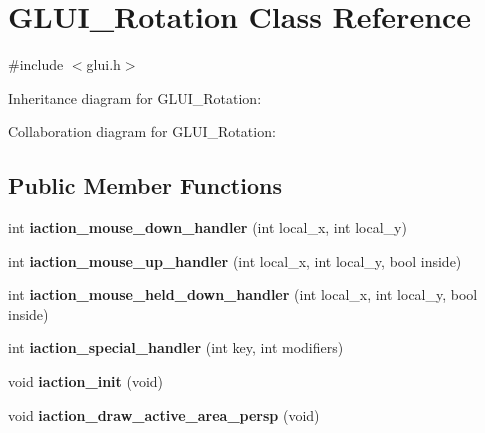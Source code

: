 \hypertarget{class_g_l_u_i___rotation}{\section{G\+L\+U\+I\+\_\+\+Rotation Class Reference}
\label{class_g_l_u_i___rotation}
}


{\ttfamily \#include $<$glui.\+h$>$}



Inheritance diagram for G\+L\+U\+I\+\_\+\+Rotation\+:


Collaboration diagram for G\+L\+U\+I\+\_\+\+Rotation\+:
\subsection*{Public Member Functions}
\begin{DoxyCompactItemize}
\item 
\hypertarget{class_g_l_u_i___rotation_a3af15515b4f2bd05bfbbc625fa4d6247}{int {\bfseries iaction\+\_\+mouse\+\_\+down\+\_\+handler} (int local\+\_\+x, int local\+\_\+y)}\label{class_g_l_u_i___rotation_a3af15515b4f2bd05bfbbc625fa4d6247}

\item 
\hypertarget{class_g_l_u_i___rotation_aa3ee9f07c589dedc7c1b6ad780566172}{int {\bfseries iaction\+\_\+mouse\+\_\+up\+\_\+handler} (int local\+\_\+x, int local\+\_\+y, bool inside)}\label{class_g_l_u_i___rotation_aa3ee9f07c589dedc7c1b6ad780566172}

\item 
\hypertarget{class_g_l_u_i___rotation_ad743bdbd88648859ef334c572e9e969d}{int {\bfseries iaction\+\_\+mouse\+\_\+held\+\_\+down\+\_\+handler} (int local\+\_\+x, int local\+\_\+y, bool inside)}\label{class_g_l_u_i___rotation_ad743bdbd88648859ef334c572e9e969d}

\item 
\hypertarget{class_g_l_u_i___rotation_a0a86badfaa9102475a2af2b2f3d824aa}{int {\bfseries iaction\+\_\+special\+\_\+handler} (int key, int modifiers)}\label{class_g_l_u_i___rotation_a0a86badfaa9102475a2af2b2f3d824aa}

\item 
\hypertarget{class_g_l_u_i___rotation_ac7029bd29427238e2590472ae882c258}{void {\bfseries iaction\+\_\+init} (void)}\label{class_g_l_u_i___rotation_ac7029bd29427238e2590472ae882c258}

\item 
\hypertarget{class_g_l_u_i___rotation_a88cf2f55e52c4afc9a81fceb53dbc406}{void {\bfseries iaction\+\_\+draw\+\_\+active\+\_\+area\+\_\+persp} (void)}\label{class_g_l_u_i___rotation_a88cf2f55e52c4afc9a81fceb53dbc406}


\end{DoxyCompactItemize}
